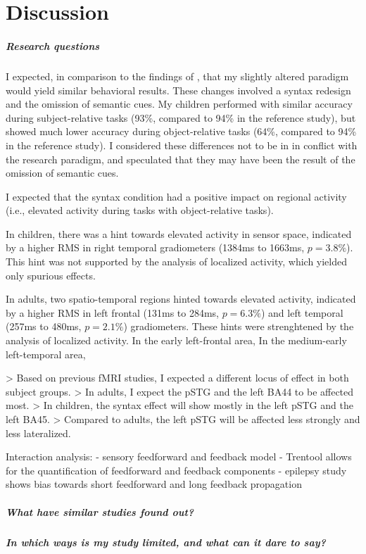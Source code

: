 
\chapter{Discussion}

\paragraph{Research questions}

I expected, in comparison to the findings of \cite{2.1}, that my slightly altered paradigm would yield similar behavioral results.
These changes involved a syntax redesign and the omission of semantic cues.
My children performed with similar accuracy during subject-relative tasks (93\%, compared to 94\% in the reference study), but showed much lower accuracy during object-relative tasks (64\%, compared to 94\% in the reference study).
I considered these differences not to be in in conflict with the research paradigm, and speculated that they may have been the result of the omission of semantic cues.


I expected that the syntax condition had a positive impact on regional activity (i.e., elevated activity during tasks with object-relative tasks).

In children, there was a hint towards elevated activity in sensor space, indicated by a higher RMS in right temporal gradiometers (1384ms to 1663ms, $p = 3.8\%$).
This hint was not supported by the analysis of localized activity, which yielded only spurious effects.

In adults, two spatio-temporal regions hinted towards elevated activity, indicated by a higher RMS in left frontal (131ms to 284ms, $p = 6.3\%$) and left temporal (257ms to 480ms, $p = 2.1\%$) gradiometers. 
These hints were strenghtened by the analysis of localized activity.
In the early left-frontal area, 
In the medium-early left-temporal area, 

> Based on previous fMRI studies, I expected a different locus of effect in both subject groups.
> In adults, I expect the pSTG and the left BA44 to be affected most.
> In children, the syntax effect will show mostly in the left pSTG and the left BA45.
> Compared to adults, the left pSTG will be affected less strongly and less lateralized.


Interaction analysis:
- sensory feedforward and feedback model
- Trentool allows for the quantification of feedforward and feedback components
- epilepsy study shows bias towards short feedforward and long feedback propagation

\paragraph{What have similar studies found out?}

\paragraph{In which ways is my study limited, and what can it dare to say?}
